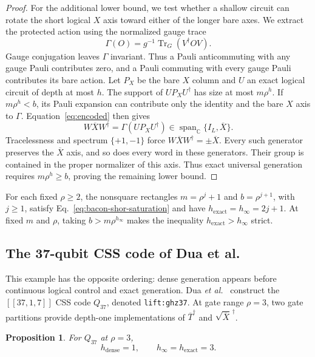 \documentclass[aps,prl,reprint,longbibliography,nofootinbib,nobibnotes]{revtex4-2}
\newtheorem{proposition}{Proposition}
\newcommand{\id}{I}
\begin{document}
\begin{proof}
For the additional lower bound, we test whether a shallow circuit can rotate the short logical $X$
axis toward either of the longer bare axes. We extract the protected action using the normalized
gauge trace
\begin{equation}\label{eq:gauge-trace}
 \Gamma(O)=g^{-1}\operatorname{Tr}_G(V^\dagger OV).
\end{equation}
Gauge conjugation leaves $\Gamma$ invariant. Thus a Pauli anticommuting with any gauge Pauli
contributes zero, and a Pauli commuting with every gauge Pauli contributes its bare action. Let
$P_X$ be the bare $X$ column and $U$ an exact logical circuit of depth at most $h$. The support of
$UP_XU^\dagger$ has size at most $m\rho^h$. If $m\rho^h<b$, its Pauli expansion can contribute only
the identity and the bare $X$ axis to $\Gamma$. Equation~\eqref{eq:encoded} then gives
\[
 W\overline X W^\dagger
 =\Gamma(UP_XU^\dagger)\in
 \operatorname{span}_{\mathbb C}\{\id_L,\overline X\}.
\]
Tracelessness and spectrum $\{+1,-1\}$ force $W\overline XW^\dagger=\pm\overline X$. Every such
generator preserves the $\overline X$ axis, and so does every word in these generators. Their group
is contained in the proper normalizer of this axis. Thus exact universal generation requires
$m\rho^h\ge b$, proving the remaining lower bound.
\end{proof}

For each fixed $\rho\ge2$, the nonsquare rectangles $m=\rho^j+1$ and $b=\rho^{j+1}$, with $j\ge1$,
satisfy Eq.~\eqref{eq:bacon-shor-saturation} and have $h_{\mathrm{exact}}=h_\infty=2j+1$. At fixed
$m$ and $\rho$, taking $b>m\rho^{h_\infty}$ makes the inequality $h_{\mathrm{exact}}>h_\infty$
strict.

\subsection*{The 37-qubit CSS code of Dua et al.}
\label{sm:dua-example}

This example has the opposite ordering: dense generation appears before continuous logical control
and exact generation. Dua \emph{et al.}~\cite[Sec.~V and App.~B]{Dua} construct the $[[37,1,7]]$
CSS code $Q_{37}$, denoted \texttt{lift:ghz37}. At gate range $\rho=3$, two gate partitions provide
depth-one implementations of $\overline T^\dagger$ and $\sqrt{\overline X}^{\,\dagger}$.

\begin{proposition}\label{prop:dua-example}
For $Q_{37}$ at $\rho=3$,
\begin{equation}\label{eq:dua-thresholds}
 h_{\mathrm{dense}}=1,\qquad h_\infty=h_{\mathrm{exact}}=3.
\end{equation}
\end{proposition}
\end{document}
